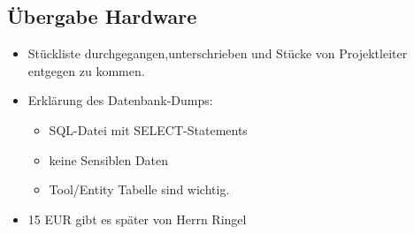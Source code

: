 \documentclass{scrartcl}
\begin{document}
\subsection{Übergabe Hardware}
\begin{itemize}
    \item Stückliste durchgegangen,unterschrieben und Stücke von Projektleiter entgegen zu kommen.
    \item Erklärung des Datenbank-Dumps:
    \begin{itemize}
        \item SQL-Datei mit SELECT-Statements
        \item keine Sensiblen Daten
        \item Tool/Entity Tabelle sind wichtig.
    \end{itemize}
    \item 15 EUR gibt es später von Herrn Ringel
\end{itemize}
\end{document}
